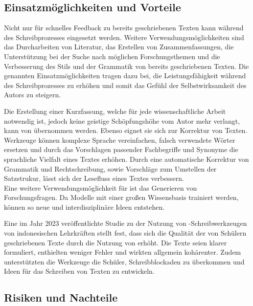 \documentclass[../main.tex]{subfiles}
\begin{document}
\subsection{Einsatzmöglichkeiten und Vorteile}
\label{sec:vorteile}

Nicht nur für schnelles Feedback zu bereits geschriebenen Texten kann  während des Schreibprozesses eingesetzt werden. 
Weitere Verwendungsmöglichkeiten sind das Durcharbeiten von Literatur, das Erstellen von Zusammenfassungen, die Unterstützung bei der Suche nach 
möglichen Forschungsthemen und die Verbesserung des Stils und der Grammatik von bereits geschriebenen Texten. Die genannten Einsatzmöglichkeiten 
tragen dazu bei, die Leistungsfähigkeit während des Schreibprozesses zu erhöhen und somit das Gefühl der Selbstwirksamkeit des Autors zu steigern.\cite{SelfEfficacyBeliefs}

Die Erstellung einer Kurzfassung, welche für jede wissenschaftliche Arbeit notwendig ist, jedoch keine geistige Schöpfungshöhe vom Autor mehr verlangt, 
kann von  übernommen werden. Ebenso eignet sie sich zur Korrektur von Texten.  Werkzeuge können komplexe Sprache vereinfachen, falsch 
verwendete Wörter ersetzen und durch das Vorschlagen passender Fachbegriffe und Synonyme die sprachliche Vielfalt eines Textes erhöhen. Durch eine 
automatische Korrektur von Grammatik und Rechtschreibung, sowie Vorschläge zum Umstellen der Satzstrukur, lässt sich der Lesefluss eines Textes verbessern.\cite{ZukunftWissenschaftlichesPublizieren,teachers}\\
Eine weitere Verwendungsmöglichkeit für  ist das Generieren von Forschungsfragen. Da  Modelle mit einer großen Wissensbasis trainiert werden, 
können so neue und interdisziplinäre Ideen entstehen.\cite{ZukunftWissenschaftlichesPublizieren,humanWritingToAi}

Eine im Jahr 2023 veröffentlichte Studie zu der Nutzung von -Schreibwerkzeugen von indonesischen Lehrkräften stellt fest, dass sich die Qualität der von 
Schülern geschriebenen Texte durch die Nutzung von  erhöht. Die Texte seien klarer formuliert, enthielten weniger Fehler und 
wirkten allgemein kohärenter. Zudem unterstützten die  Werkzeuge die Schüler, Schreibblockaden zu überkommen und Ideen für das Schreiben von Texten zu entwickeln.\cite{teachers} 

\subsection{Risiken und Nachteile}
\label{sec:nachteile}
\end{document}
